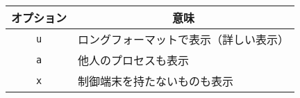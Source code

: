 \documentclass{standalone}
\begin{document}
{\ttfamily
\begin{tabular}{c|l}
\hline\hline
\multicolumn{1}{c}{オプション} &
\multicolumn{1}{|c}{意味} \\
\hline
\texttt{u} & ロングフォーマットで表示（詳しい表示） \\
\texttt{a} & 他人のプロセスも表示                   \\
\texttt{x} & 制御端末を持たないものも表示
\end{tabular}}
\end{document}
